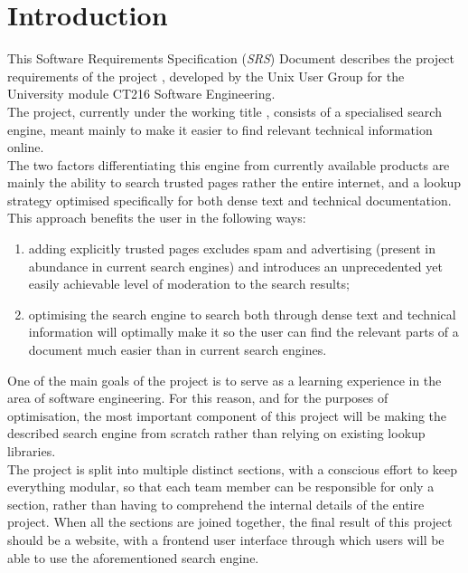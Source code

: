 \section{Introduction}

This Software Requirements Specification (\textit{SRS}) Document describes the project requirements of the project \projectname, 
developed by the Unix User Group for the University module CT216 Software Engineering. \\

The project, currently under the working title \projectname, consists of a specialised search engine, meant mainly to make it easier to find relevant technical information online. \\

The two factors differentiating this engine from currently available products are mainly the ability to search trusted pages rather the entire internet, 
and a lookup strategy optimised specifically for both dense text and technical documentation.
This approach benefits the user in the following ways:
\begin{enumerate}
    \item adding explicitly trusted pages excludes spam and advertising (present in abundance in current search engines) and introduces an unprecedented yet easily achievable level of moderation to the search results;
    \item optimising the search engine to search both through dense text and technical information will optimally make it so the user can find the relevant parts of a document much easier than in current search engines.
\end{enumerate}

One of the main goals of the project is to serve as a learning experience in the area of software engineering. For this reason, and for the purposes of optimisation,
the most important component of this project will be making the described search engine from scratch rather than relying on existing lookup libraries. \\

The project is split into multiple distinct sections, with a conscious effort to keep everything modular, so that each team member can be responsible for only a section,
rather than having to comprehend the internal details of the entire project.
When all the sections are joined together, the final result of this project should be a website, with a frontend user interface through which users will be able to use the aforementioned search engine. \\

